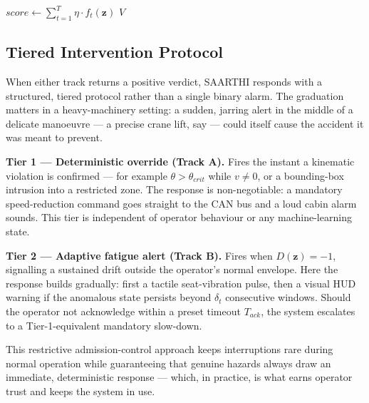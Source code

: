 \begin{algorithm}[h]
\caption{Hybrid Execution Flow}
\label{alg:hybrid}
$\mathit{score} \gets \sum_{t=1}^{T} \eta \cdot f_t(\mathbf{z})$\;
\Return $V$\;
\end{algorithm}

\subsection{Tiered Intervention Protocol}

When either track returns a positive verdict, SAARTHI responds with a
structured, tiered protocol rather than a single binary alarm. The graduation
matters in a heavy-machinery setting: a sudden, jarring alert in the middle of a
delicate manoeuvre --- a precise crane lift, say --- could itself cause the
accident it was meant to prevent.

\medskip
\noindent\textbf{Tier 1 --- Deterministic override (Track A).} Fires the instant
a kinematic violation is confirmed --- for example $\theta > \theta_{crit}$ while
$v \neq 0$, or a bounding-box intrusion into a restricted zone. The response is
non-negotiable: a mandatory speed-reduction command goes straight to the CAN bus
and a loud cabin alarm sounds. This tier is independent of operator behaviour or
any machine-learning state.

\medskip
\noindent\textbf{Tier 2 --- Adaptive fatigue alert (Track B).} Fires when
$D(\mathbf{z}) = -1$, signalling a sustained drift outside the operator's normal
envelope. Here the response builds gradually: first a tactile seat-vibration
pulse, then a visual HUD warning if the anomalous state persists beyond
$\delta_t$ consecutive windows. Should the operator not acknowledge within a
preset timeout $T_{ack}$, the system escalates to a Tier-1-equivalent mandatory
slow-down.

\medskip
This restrictive admission-control approach keeps interruptions rare during
normal operation while guaranteeing that genuine hazards always draw an
immediate, deterministic response --- which, in practice, is what earns operator
trust and keeps the system in use.

